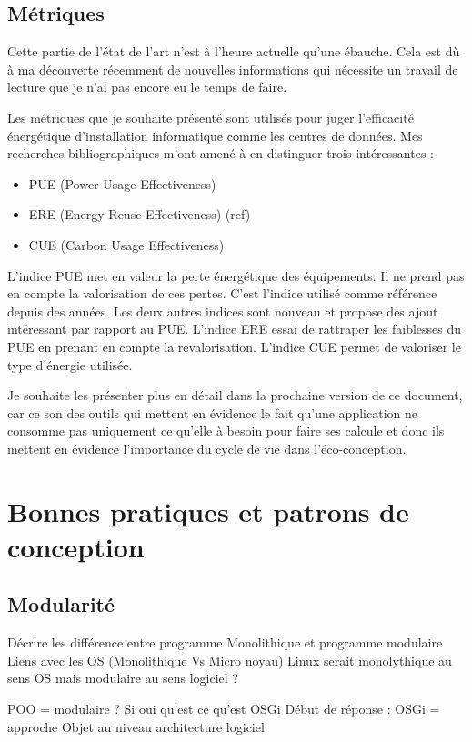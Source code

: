 \documentclass[a4paper, 11pt]{report}
\begin{document}
\subsection{Métriques}
Cette partie de l'état de l'art n'est à l'heure actuelle qu'une ébauche. Cela est dù à ma découverte récemment de nouvelles informations qui nécessite un travail de lecture que je n'ai pas encore eu le temps de faire.

Les métriques que je souhaite présenté sont utilisés pour juger l'efficacité énergétique d'installation informatique comme les centres de données. Mes recherches bibliographiques m'ont amené à en distinguer trois intéressantes :
\begin{itemize}
	\item PUE (Power Usage Effectiveness)
	\item ERE (Energy Reuse Effectiveness) (ref)
	\item CUE (Carbon Usage Effectiveness)
\end{itemize}

L’indice PUE met en valeur la perte énergétique des équipements. Il ne prend pas en compte la valorisation de ces pertes. C'est l'indice utilisé comme référence depuis des années. Les deux autres indices sont nouveau et propose des ajout intéressant par rapport au PUE. L’indice ERE essai de rattraper les faiblesses du PUE en prenant en compte la revalorisation. L’indice CUE permet de valoriser le type d’énergie utilisée.

Je souhaite les présenter plus en détail dans la prochaine version de ce document, car ce son des outils qui mettent en évidence le fait qu'une application ne consomme pas uniquement ce qu'elle à besoin pour faire ses calcule  et donc ils mettent en évidence l'importance du cycle de vie dans l'éco-conception.

\section{Bonnes pratiques et patrons de conception}
\subsection{Modularité}
Décrire les différence entre programme Monolithique et programme modulaire
	Liens avec les OS (Monolithique Vs Micro noyau)
	Linux serait monolythique au sens OS mais modulaire au sens logiciel ?

POO = modulaire ?
	Si oui qu’est ce qu’est OSGi
	Début de réponse : OSGi = approche Objet au niveau architecture logiciel
\end{document}
